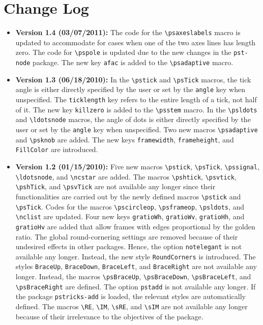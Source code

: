 \documentclass[11pt,makeidx]{article}
\makeatletter
\def\CMDn#1{\mbox{\texttt{\textbackslash #1}}}
\def\KWDn#1{\mbox{\texttt{#1}}}
\def\PKGn#1{\mbox{\texttt{#1}}}
\def\PKG#1{\PKGn{#1}\index{Package!#1@\texttt{#1}}}
\makeatother
\begin{document}
\section{Change Log}
\label{sec:change log}

\begin{itemize}[label=$\scriptscriptstyle\blacksquare$]
\item \textbf{Version 1.4 (03/07/2011):} The code for the \CMDn{psaxeslabels} macro is updated to accommodate for cases when one of the two axes lines has length zero. The code for \CMDn{pspole} is updated due to the new changes in the \PKG{pst-node} package. The new key \KWDn{afac} is added to the \CMDn{psadaptive} macro.

\item \textbf{Version 1.3 (06/18/2010):} In the \CMDn{pstick} and \CMDn{psTick} macros, the tick angle is either directly specified by the user or set by the \KWDn{angle} key when unspecified. The \KWDn{ticklength} key refers to the entire length of a tick, not half of it. The new key \KWDn{killzero} is added to the \CMDn{psstem} macro. In the \CMDn{psldots} and \CMDn{ldotsnode} macros, the angle of dots is either directly specified by the user or set by the \KWDn{angle} key when unspecified. Two new macros \CMDn{psadaptive} and \CMDn{psknob} are added. The new keys \KWDn{framewidth}, \KWDn{frameheight}, and \KWDn{FillColor} are introduced.

\item \textbf{Version 1.2 (01/15/2010):} Five new macros \CMDn{pstick}, \CMDn{psTick}, \CMDn{pssignal}, \CMDn{ldotsnode}, and \CMDn{ncstar} are added. The macros \CMDn{pshtick}, \CMDn{psvtick}, \CMDn{pshTick}, and \CMDn{psvTick} are not available any longer since their functionalities are carried out by the newly defined macros \CMDn{pstick} and \CMDn{psTick}. Codes for the macros \CMDn{pscircleop}, \CMDn{psframeop}, \CMDn{psldots}, and \CMDn{nclist} are updated. Four new keys \KWDn{gratioWh}, \KWDn{gratioWv}, \KWDn{gratioHh}, and \KWDn{gratioHv} are added that allow frames with edges proportional by the golden ratio. The global round-cornering settings are removed because of their undesired effects in other packages. Hence, the option \KWDn{notelegant} is not available any longer. Instead, the new style \KWDn{RoundCorners} is introduced. The styles \KWDn{BraceUp}, \KWDn{BraceDown}, \KWDn{BraceLeft}, and \KWDn{BraceRight} are not available any longer. Instead, the macros \CMDn{psBraceUp}, \CMDn{psBraceDown}, \CMDn{psBraceLeft}, and \CMDn{psBraceRight} are defined. The option \KWDn{pstadd} is not available any longer. If the package \PKGn{pstricks-add} is loaded, the relevant styles are automatically defined. The macros \CMDn{RE}, \CMDn{IM}, \CMDn{sRE}, and \CMDn{sIM} are not available any longer because of their irrelevance to the objectives of the package.


\end{itemize}
\end{document}
